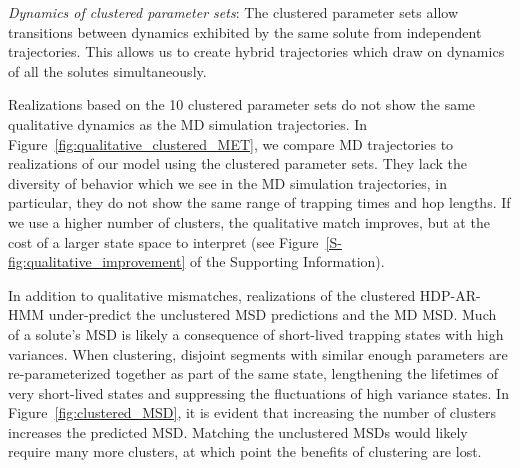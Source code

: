\documentclass[journal=jpcbfk,manuscript=article]{achemso}
\begin{document}
  \textit{Dynamics of clustered parameter sets}: The clustered
  parameter sets allow transitions between dynamics exhibited by the
  same solute from independent trajectories. This allows us to create
  hybrid trajectories which draw on dynamics of all the solutes
  simultaneously.
  
  Realizations based on the 10 clustered parameter sets do not show the same
  qualitative dynamics as the MD simulation trajectories. In 
  Figure~\ref{fig:qualitative_clustered_MET}, we compare MD trajectories to 
  realizations of our model using the clustered parameter sets. They lack the
  diversity of behavior which we see in the MD simulation trajectories, in particular, 
  they do not show the same range of trapping times and hop lengths. If we use
  a higher number of clusters, the qualitative match improves, but at the cost
  of a larger state space to interpret (see Figure~\ref{S-fig:qualitative_improvement}
  of the Supporting Information).
  
  In addition to qualitative mismatches, realizations of the clustered HDP-AR-HMM 
  under-predict the unclustered MSD predictions and the MD MSD. Much of a solute's 
  MSD is likely a consequence of short-lived trapping states with high variances.
  When clustering, disjoint segments with similar enough parameters are re-parameterized
  together as part of the same state, lengthening the lifetimes of very short-lived 
  states and suppressing the fluctuations of high variance states. In 
  Figure~\ref{fig:clustered_MSD}, it is evident that increasing the number of clusters
  increases the predicted MSD. Matching the unclustered MSDs would likely require many
  more clusters, at which point the benefits of clustering are lost. 
  
\end{document}
